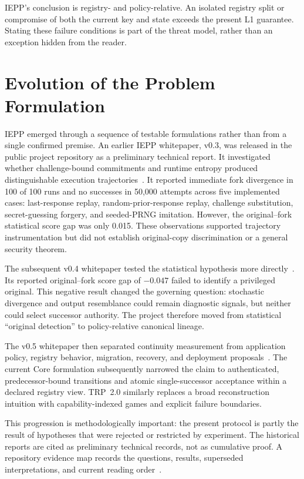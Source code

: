 \documentclass[11pt]{article}
\begin{document}
IEPP's conclusion is registry- and policy-relative. An isolated registry split or compromise of both the current key and state exceeds the present L1 guarantee. Stating these failure conditions is part of the threat model, rather than an exception hidden from the reader.

\section{Evolution of the Problem Formulation}
IEPP emerged through a sequence of testable formulations rather than from a single confirmed premise. An earlier IEPP whitepaper, v0.3, was released in the public project repository as a preliminary technical report. It investigated whether challenge-bound commitments and runtime entropy produced distinguishable execution trajectories~\cite{seo2026v03}. It reported immediate fork divergence in 100 of 100 runs and no successes in 50,000 attempts across five implemented cases: last-response replay, random-prior-response replay, challenge substitution, secret-guessing forgery, and seeded-PRNG imitation. However, the original--fork statistical score gap was only 0.015. These observations supported trajectory instrumentation but did not establish original-copy discrimination or a general security theorem.

The subsequent v0.4 whitepaper tested the statistical hypothesis more directly~\cite{seo2026v04}. Its reported original--fork score gap of $-0.047$ failed to identify a privileged original. This negative result changed the governing question: stochastic divergence and output resemblance could remain diagnostic signals, but neither could select successor authority. The project therefore moved from statistical ``original detection'' to policy-relative canonical lineage.

The v0.5 whitepaper then separated continuity measurement from application policy, registry behavior, migration, recovery, and deployment proposals~\cite{seo2026v05}. The current Core formulation subsequently narrowed the claim to authenticated, predecessor-bound transitions and atomic single-successor acceptance within a declared registry view. TRP~2.0 similarly replaces a broad reconstruction intuition with capability-indexed games and explicit failure boundaries.

This progression is methodologically important: the present protocol is partly the result of hypotheses that were rejected or restricted by experiment. The historical reports are cited as preliminary technical records, not as cumulative proof. A repository evidence map records the questions, results, superseded interpretations, and current reading order~\cite{seo2026evolution}.
\end{document}
